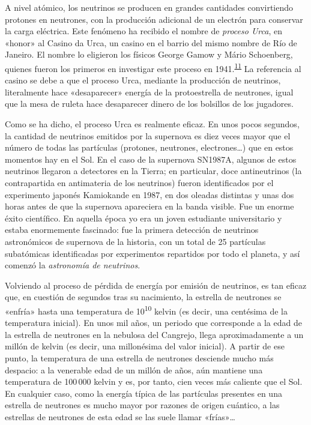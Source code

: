 A nivel atómico, los neutrinos se producen en grandes cantidades convirtiendo protones en neutrones, con la producción adicional de un electrón para conservar la carga eléctrica. Este fenómeno ha recibido el nombre de \emph{proceso Urca}, en «honor» al Casino da Urca, un casino en el barrio del mismo nombre de Río de Janeiro. El nombre lo eligieron los físicos George Gamow y Mário Schoenberg, quienes fueron los primeros en investigar este proceso en 1941.\textsuperscript{\hyperlink{note:05-11}{11}} La referencia al casino se debe a que el proceso Urca, mediante la producción de neutrinos, literalmente hace «desaparecer» energía de la protoestrella de neutrones, igual que la mesa de ruleta hace desaparecer dinero de los bolsillos de los jugadores.

Como se ha dicho, el proceso Urca es realmente eficaz. En unos pocos segundos, la cantidad de neutrinos emitidos por la supernova es diez veces mayor que el número de todas las partículas (protones, neutrones, electrones…) que en estos momentos hay en el Sol. En el caso de la supernova SN1987A, algunos de estos neutrinos llegaron a detectores en la Tierra; en particular, doce antineutrinos (la contrapartida en antimateria de los neutrinos) fueron identificados por el experimento japonés Kamiokande en 1987, en dos oleadas distintas y unas dos horas antes de que la supernova apareciera en la banda visible. Fue un enorme éxito científico. En aquella época yo era un joven estudiante universitario y estaba enormemente fascinado: fue la primera detección de neutrinos astronómicos de supernova de la historia, con un total de 25 partículas subatómicas identificadas por experimentos repartidos por todo el planeta, y así comenzó la \emph{astronomía de neutrinos}.

Volviendo al proceso de pérdida de energía por emisión de neutrinos, es tan eficaz que, en cuestión de segundos tras su nacimiento, la estrella de neutrones se «enfría» hasta una temperatura de 10\textsuperscript{10} kelvin (es decir, una centésima de la temperatura inicial). En unos mil años, un periodo que corresponde a la edad de la estrella de neutrones en la nebulosa del Cangrejo, llega aproximadamente a un millón de kelvin (es decir, una millonésima del valor inicial). A partir de ese punto, la temperatura de una estrella de neutrones desciende mucho más despacio: a la venerable edad de un millón de años, aún mantiene una temperatura de 100\,000 kelvin y es, por tanto, cien veces más caliente que el Sol. En cualquier caso, como la energía típica de las partículas presentes en una estrella de neutrones es mucho mayor por razones de origen cuántico, a las estrellas de neutrones de esta edad se las suele llamar «frías»…

